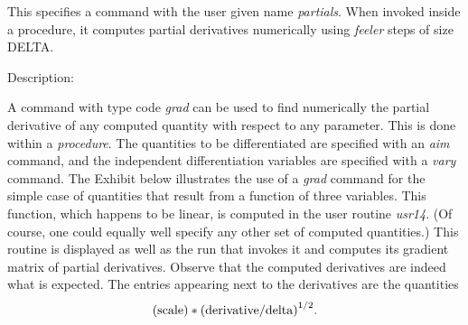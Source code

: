 This specifies a command with the user given name {\em partials}.  When invoked inside a procedure, it computes partial derivatives numerically using {\em feeler} steps of size DELTA.

\vspace{5mm}
     Description:
\vspace{2mm}

A command with type code {\em grad} can be used to find numerically the partial derivative of any \Mary computed quantity with respect to any parameter.  This is done within a {\em procedure}.  The quantities to be differentiated are specified with an {\em aim} command, and the independent differentiation variables are specified with a {\em vary} command.  The Exhibit below illustrates the use of a {\em grad} command for the simple case of quantities that result from a function of three variables.  This function, which happens to be linear, is computed in the user routine {\em usr14}.  (Of course, one could equally well specify any other set of \Mary computed quantities.)  This routine is displayed as well as the \Mary run that invokes it and computes its gradient matrix of partial derivatives.  Observe that the computed derivatives  are indeed what is expected.  The entries appearing next to the derivatives are the quantities
\[
{\rm (scale)}*{\rm (derivative/delta)}^{1/2}.
\]

